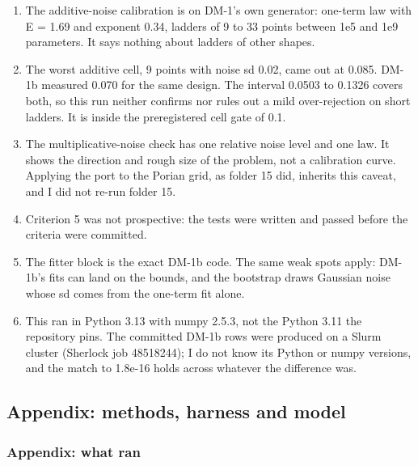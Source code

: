 \begin{enumerate}
  \item The additive-noise calibration is on DM-1's own generator: one-term law with E = 1.69 and exponent 0.34, ladders of 9 to 33 points between 1e5 and 1e9 parameters. It says nothing about ladders of other shapes.
  \item The worst additive cell, 9 points with noise sd 0.02, came out at 0.085. DM-1b measured 0.070 for the same design. The interval 0.0503 to 0.1326 covers both, so this run neither confirms nor rules out a mild over-rejection on short ladders. It is inside the preregistered cell gate of 0.1.
  \item The multiplicative-noise check has one relative noise level and one law. It shows the direction and rough size of the problem, not a calibration curve. Applying the port to the Porian grid, as folder 15 did, inherits this caveat, and I did not re-run folder 15.
  \item Criterion 5 was not prospective: the tests were written and passed before the criteria were committed.
  \item The fitter block is the exact DM-1b code. The same weak spots apply: DM-1b's fits can land on the bounds, and the bootstrap draws Gaussian noise whose sd comes from the one-term fit alone.
  \item This ran in Python 3.13 with numpy 2.5.3, not the Python 3.11 the repository pins. The committed DM-1b rows were produced on a Slurm cluster (Sherlock job 48518244); I do not know its Python or numpy versions, and the match to 1.8e-16 holds across whatever the difference was.
\end{enumerate}


\subsection*{Appendix: methods, harness and model}
\subsubsection*{Appendix: what ran}

